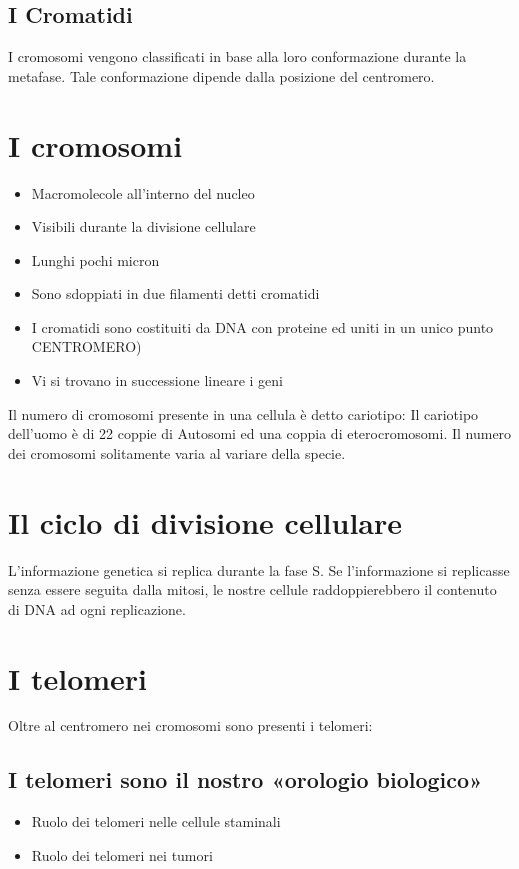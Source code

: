 \documentclass{article}
\begin{document}
\subsection{I Cromatidi}I cromosomi vengono classificati in base alla loro conformazione durante la metafase. Tale conformazione dipende dalla posizione del centromero.
\section{I cromosomi}
\begin{itemize}
    \item Macromolecole all'interno del nucleo 
    \item Visibili durante la divisione cellulare 
    \item Lunghi pochi micron 
    \item Sono sdoppiati in due filamenti detti cromatidi 
    \item I cromatidi sono costituiti da DNA con proteine ed uniti in un unico punto CENTROMERO) 
    \item Vi si trovano in successione lineare i geni
\end{itemize}
Il numero di cromosomi presente in una cellula è detto cariotipo:
Il cariotipo dell'uomo è di 22 coppie di Autosomi ed una coppia di eterocromosomi. Il numero dei cromosomi solitamente varia al variare della specie.
\section{Il ciclo di divisione cellulare} L'informazione genetica si replica durante la fase S. Se l'informazione si replicasse senza essere seguita dalla mitosi, le nostre cellule raddoppierebbero il contenuto di DNA ad ogni replicazione.
\section{I telomeri}Oltre al centromero nei cromosomi sono presenti i telomeri:
\subsection{I telomeri sono il nostro «orologio biologico»}
\begin{itemize}
    \item Ruolo dei telomeri nelle cellule staminali 
    \item Ruolo dei telomeri nei tumori 
\end{itemize}
\end{document}

